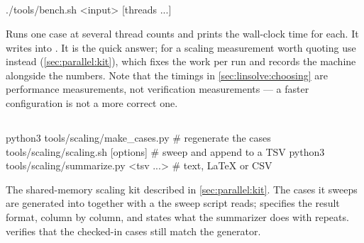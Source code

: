 \subsection{}

\begin{shell}
./tools/bench.sh <input> [threads ...]
\end{shell}

Runs one case at several thread counts and prints the wall-clock time for each.
It writes into . It is the quick answer; for a
scaling measurement worth quoting use  instead
(\cref{sec:parallel:kit}), which fixes the work per run and records the
machine alongside the numbers. Note that the timings in
\cref{sec:linsolve:choosing} are performance measurements, not verification
measurements --- a faster configuration is not a more correct one.

\subsection{}

\begin{shell}
python3 tools/scaling/make_cases.py            # regenerate the cases
tools/scaling/scaling.sh [options]             # sweep and append to a TSV
python3 tools/scaling/summarize.py <tsv ...>   # text, LaTeX or CSV
\end{shell}

The shared-memory scaling kit described in \cref{sec:parallel:kit}. The cases
it sweeps are generated into  together with a
 the sweep script reads; 
specifies the result format, column by column, and states what the summarizer
does with repeats.  verifies that the checked-in
cases still match the generator.
